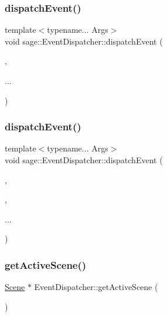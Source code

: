 \subsubsection{\texorpdfstring{dispatchEvent()}{dispatchEvent()}\hspace{0.1cm}{\footnotesize\ttfamily [1/2]}}
{\footnotesize\ttfamily template$<$typename... Args$>$ \\
void sage\+::\+Event\+Dispatcher\+::dispatch\+Event (\begin{DoxyParamCaption}\item[{\mbox{\hyperlink{namespacesage_afe706a25026cc74fe69b56d53a265d29}{Event}}}]{,  }\item[{Args \&\&}]{... }\end{DoxyParamCaption})}

\mbox{\label{classsage_1_1EventDispatcher_a80201aec738c2f1aaa5b812f867f28fd}} 
\subsubsection{\texorpdfstring{dispatchEvent()}{dispatchEvent()}\hspace{0.1cm}{\footnotesize\ttfamily [2/2]}}
{\footnotesize\ttfamily template$<$typename... Args$>$ \\
void sage\+::\+Event\+Dispatcher\+::dispatch\+Event (\begin{DoxyParamCaption}\item[{\mbox{\hyperlink{namespacesage_ad2c7b0e1ebf67f572d43620e6b07aa13}{Node\+Event}}}]{,  }\item[{std\+::function$<$ bool(\mbox{\hyperlink{classsage_1_1Node}{Node}} \&, Args...)$>$ \&\&}]{,  }\item[{Args \&\&}]{... }\end{DoxyParamCaption})}

\mbox{\label{classsage_1_1EventDispatcher_a360b6c05663a1716b7caad26dbc89279}} 
\subsubsection{\texorpdfstring{getActiveScene()}{getActiveScene()}}
{\footnotesize\ttfamily \mbox{\hyperlink{classsage_1_1Scene}{Scene}} $\ast$ Event\+Dispatcher\+::get\+Active\+Scene (\begin{DoxyParamCaption}{ }\end{DoxyParamCaption})\hspace{0.3cm}{\ttfamily [private]}}


